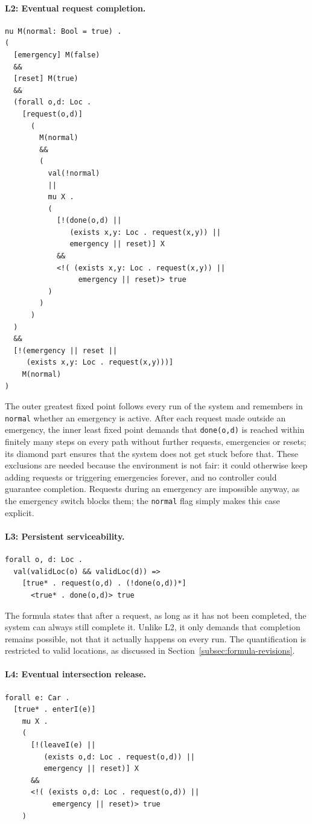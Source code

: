 \paragraph{L2: Eventual request completion.}
\noindent \begin{lstlisting}
nu M(normal: Bool = true) .
(
  [emergency] M(false)
  &&
  [reset] M(true)
  &&
  (forall o,d: Loc .
    [request(o,d)]
      (
        M(normal)
        &&
        (
          val(!normal)
          ||
          mu X .
          (
            [!(done(o,d) ||
               (exists x,y: Loc . request(x,y)) ||
               emergency || reset)] X
            &&
            <!( (exists x,y: Loc . request(x,y)) ||
                 emergency || reset)> true
          )
        )
      )
  )
  &&
  [!(emergency || reset ||
     (exists x,y: Loc . request(x,y)))]
    M(normal)
)
\end{lstlisting}
The outer greatest fixed point follows every run of the system and remembers in \texttt{normal} whether an emergency is active. After each request made outside an emergency, the inner least fixed point demands that \texttt{done(o,d)} is reached within finitely many steps on every path without further requests, emergencies or resets; its diamond part ensures that the system does not get stuck before that. These exclusions are needed because the environment is not fair: it could otherwise keep adding requests or triggering emergencies forever, and no controller could guarantee completion. Requests during an emergency are impossible anyway, as the emergency switch blocks them; the \texttt{normal} flag simply makes this case explicit.

\paragraph{L3: Persistent serviceability.}
\noindent \begin{lstlisting}
forall o, d: Loc .
  val(validLoc(o) && validLoc(d)) =>
    [true* . request(o,d) . (!done(o,d))*]
      <true* . done(o,d)> true
\end{lstlisting}
The formula states that after a request, as long as it has not been completed, the system can always still complete it. Unlike L2, it only demands that completion remains possible, not that it actually happens on every run. The quantification is restricted to valid locations, as discussed in Section~\ref{subsec:formula-revisions}.

\paragraph{L4: Eventual intersection release.}
\noindent \begin{lstlisting}
forall e: Car .
  [true* . enterI(e)]
    mu X .
    (
      [!(leaveI(e) ||
         (exists o,d: Loc . request(o,d)) ||
         emergency || reset)] X
      &&
      <!( (exists o,d: Loc . request(o,d)) ||
           emergency || reset)> true
    )
\end{lstlisting}

